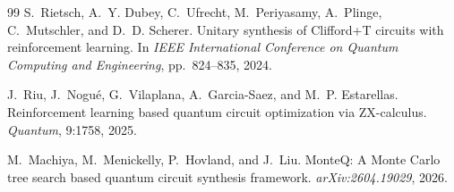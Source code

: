 \documentclass[UTF8,fontset=macnew,11pt]{ctexart}
\begin{document}
\begin{thebibliography}{99}
S.~Rietsch, A.~Y. Dubey, C.~Ufrecht, M.~Periyasamy, A.~Plinge, C.~Mutschler, and D.~D. Scherer.
\newblock Unitary synthesis of Clifford+T circuits with reinforcement learning.
\newblock In \emph{IEEE International Conference on Quantum Computing and Engineering}, pp.~824--835, 2024.

J.~Riu, J.~Nogu{\'e}, G.~Vilaplana, A.~Garcia-Saez, and M.~P. Estarellas.
\newblock Reinforcement learning based quantum circuit optimization via ZX-calculus.
\newblock \emph{Quantum}, 9:1758, 2025.

M.~Machiya, M.~Menickelly, P.~Hovland, and J.~Liu.
\newblock MonteQ: A Monte Carlo tree search based quantum circuit synthesis framework.
\newblock \emph{arXiv:2604.19029}, 2026.

\end{thebibliography}
\end{document}
